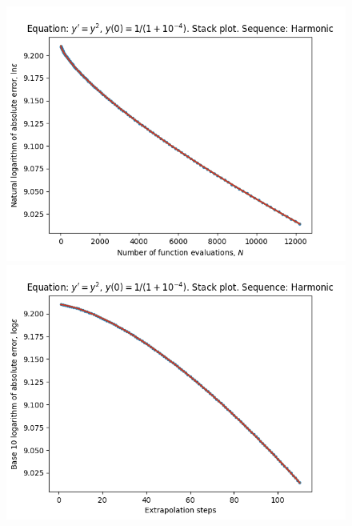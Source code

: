\begin{figure}[H]
\centering
\begin{minipage}{0.45\textwidth}
\centering
\includegraphics[scale=0.45]{emr_plots/singularity_4_hp_harmonic_stack.png}
\end{minipage}
\begin{minipage}{0.45\textwidth}
\centering
\includegraphics[scale=0.45]{emr_plots/singularity_4_hp_harmonic_steps_stack.png}
\end{minipage}
\end{figure}


